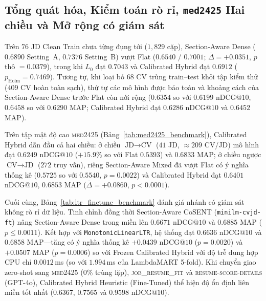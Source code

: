 

\subsection{Tổng quát hóa, Kiểm toán rò rỉ, \texttt{med2425} Hai chiều và Mở rộng có giám sát}
Trên $76$ JD Clean Train chưa từng đụng tới ($1{,}829$ cặp), Section-Aware Dense ($0.6890$ Setting~A, $0.7376$ Setting~B) vượt Flat ($0.6540$ / $0.7001$; $\bar{\Delta}=+0.0351$, $p$ thô $=0.0379$), trong khi $L_0$ đạt $0.7043$ và Calibrated Hybrid đạt $0.6912$ ($p_{\text{Holm}}=0.7469$). Tương tự, khi loại bỏ $68$ CV trùng train--test khỏi tập kiểm thử ($409$ CV hoàn toàn sạch), thứ tự các mô hình được bảo toàn và khoảng cách của Section-Aware Dense trước Flat còn nới rộng ($0.6354$ so với $0.6199$ $\text{nDCG}@10$, $0.6458$ so với $0.6290$ $\text{MAP}$; Calibrated Hybrid đạt $0.6286$ $\text{nDCG}@10$ và $0.6452$ $\text{MAP}$).



Trên tập mật độ cao \textsc{med2425} (Bảng~\ref{tab:med2425_benchmark}), Calibrated Hybrid dẫn đầu cả hai chiều: ở chiều $\text{JD}\rightarrow\text{CV}$ ($41$ JD, $\approx 209$ CV/JD) mô hình đạt $\mathbf{0.6249}$ $\text{nDCG}@10$ ($+15.9\%$ so với Flat $0.5393$) và $\mathbf{0.6833}$ $\text{MAP}$; ở chiều ngược $\text{CV}\rightarrow\text{JD}$ ($272$ truy vấn), riêng Section-Aware Mixed đã vượt Flat có ý nghĩa thống kê ($0.5725$ so với $0.5540$, $p=0.0022$) và Calibrated Hybrid đạt $\mathbf{0.6401}$ $\text{nDCG}@10$, $\mathbf{0.6853}$ $\text{MAP}$ ($\bar{\Delta}=+0.0860$, $p<0.0001$).

Cuối cùng, Bảng~\ref{tab:ltr_finetune_benchmark} đánh giá nhánh có giám sát không rò rỉ dữ liệu. Tinh chỉnh đồng thời Section-Aware CoSENT (\texttt{minilm-cvjd-ft}) nâng Section-Aware Dense trong miền lên $\mathbf{0.6671}$ $\text{nDCG}@10$ và $\mathbf{0.6885}$ $\text{MAP}$ ($p\le 0.0011$). Kết hợp với \texttt{MonotonicLinearLTR}, hệ thống đạt $0.6636$ $\text{nDCG}@10$ và $0.6858$ $\text{MAP}$---tăng có ý nghĩa thống kê $+0.0439$ $\text{nDCG}@10$ ($p=0.0020$) và $+0.0507$ $\text{MAP}$ ($p=0.0006$) so với Frozen Calibrated Hybrid với độ trễ dung hợp CPU chỉ $0.0012$\,ms (so với $1.994$\,ms của LambdaMART 5-fold). Khi chuyển giao zero-shot sang \textsc{med2425} ($0\%$ trùng lặp), \textsc{job\_resume\_fit} và \textsc{resume-score-details} (GPT-4o), Calibrated Hybrid Heuristic (Fine-Tuned) thể hiện độ ổn định liên miền tốt nhất ($0.6367$, $0.7565$ và $0.9598$ $\text{nDCG}@10$).


